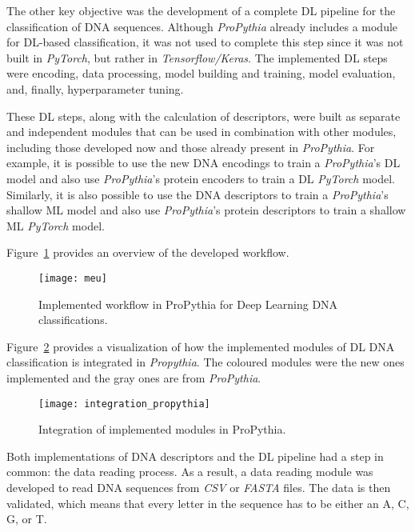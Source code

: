 The other key objective was the development of a complete \gls{DL} pipeline for the classification of \gls{DNA} sequences. Although \textit{ProPythia} already includes a module for \gls{DL}-based classification, it was not used to complete this step since it was not built in \textit{PyTorch}, but rather in \textit{Tensorflow/Keras}. The implemented \gls{DL} steps were encoding, data processing, model building and training, model evaluation, and, finally, hyperparameter tuning. 

These \gls{DL} steps, along with the calculation of descriptors, were built as separate and independent modules that can be used in combination with other modules, including those developed now and those already present in \textit{ProPythia}. For example, it is possible to use the new \gls{DNA} encodings to train a \textit{ProPythia}'s \gls{DL} model and also use \textit{ProPythia}'s protein encoders to train a \gls{DL} \textit{PyTorch} model. Similarly, it is also possible to use the \gls{DNA} descriptors to train a \textit{ProPythia}'s shallow \gls{ML} model and also use \textit{ProPythia}'s protein descriptors to train a shallow \gls{ML} \textit{PyTorch} model.

Figure~\ref{fig:meu} provides an overview of the developed workflow.

\begin{figure}[htbp]
    \centering
    \texttt{[image: meu]}
    \caption{Implemented workflow in ProPythia for Deep Learning DNA classifications.}
    \label{fig:meu}
\end{figure}

Figure~\ref{fig:integration_propythia} provides a visualization of how the implemented modules of \gls{DL} \gls{DNA} classification is integrated in \textit{Propythia}. The coloured modules were the new ones implemented and the gray ones are from \textit{ProPythia}.

\begin{figure}[htbp]
    \centering
    \texttt{[image: integration\_propythia]}
    \caption{Integration of implemented modules in ProPythia.}
    \label{fig:integration_propythia}
\end{figure}

Both implementations of \gls{DNA} descriptors and the \gls{DL} pipeline had a step in common: the data reading process. As a result, a data reading module was developed to read \gls{DNA} sequences from \textit{CSV} or \textit{FASTA} files. The data is then validated, which means that every letter in the sequence has to be either an \gls{A}, \gls{C}, \gls{G}, or \gls{T}.

